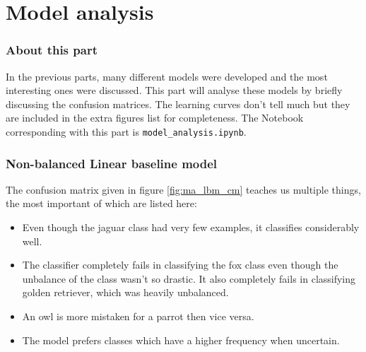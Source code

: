 \part{Model analysis}
\label{part:model_anal}


\section{About this part}
\label{section:ma_about_part}

In the previous parts, many different models were developed and the most interesting ones were discussed.
This part will analyse these models by briefly discussing the confusion matrices.
The learning curves don't tell much but they are included in the extra figures list for completeness.
The Notebook corresponding with this part is \texttt{model\_analysis.ipynb}.


\section{Non-balanced Linear baseline model}
\label{section:ma_lbm_nonb}

The confusion matrix given in figure \ref{fig:ma_lbm_cm} teaches us multiple things, the most important of which are listed here:
\begin{itemize}
    \item Even though the jaguar class had very few examples, it classifies considerably well.
    \item The classifier completely fails in classifying the fox class even though the unbalance of the class wasn't so drastic. It also completely fails in classifying golden retriever, which was heavily unbalanced.
    \item An owl is more mistaken for a parrot then vice versa. 
    \item The model prefers classes which have a higher frequency when uncertain.
\end{itemize}

